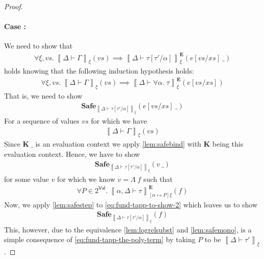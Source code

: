 \documentclass{article}
\newcommand{\VAL}{\mathsf{Val}}
\newcommand{\ectx}{\mathbf{K}}
\newcommand{\pred}{P}
\newcommand{\semtyp}[3]{\left\llbracket #2 \vdash #3 \right\rrbracket_{#1}}
\newcommand{\semErel}[1]{#1^{\textbf{E}}}
\newcommand{\semenv}{\xi}
\newcommand{\TArg}{\_}
\newcommand{\TLam}{\Lambda}
\newcommand{\Tctx}{\Gamma}
\newcommand{\CtxTps}{\Delta}
\newcommand{\expr}{e}
\newcommand{\exprB}{f}
\newcommand{\val}{v}
\newcommand{\typ}{\tau}
\newcommand{\TForall}{\forall}
\newcommand{\tvar}{\alpha}
\newcommand{\Safe}[1]{\textbf{Safe}_{#1}}
\begin{document}
\begin{proof}
\paragraph{Case :}
We need to show that
\begin{align}
  \label{eq:fund-tapp-main}
  \forall \semenv, \mathit{vs}.~\semtyp{\semenv}{\CtxTps}{\Tctx}(\mathit{vs}) \implies
  \semErel{\semtyp{\semenv}{\CtxTps}{\typ[\typ'/\tvar]}}(\expr[\mathit{vs}/\mathit{xs}]~\TArg)
\end{align}
holds knowing that the following induction hypothesis holds:
\begin{align}
  \label{eq:fund-tapp-ih}
  \forall \semenv, \mathit{vs}.~\semtyp{\semenv}{\CtxTps}{\Tctx}(\mathit{vs}) \implies \semErel{\semtyp{\semenv}{\CtxTps}{\TForall \tvar.\; \typ}}(\expr[\mathit{vs}/\mathit{xs}])
\end{align}
That is, we need to show
\begin{align}
  \label{eq:fund-tapp-to-show-1}
  \Safe{\semtyp{\semenv}{\CtxTps}{\typ[\typ'/\tvar]}}(\expr[\mathit{vs}/\mathit{xs}]~\TArg)
\end{align}
For a sequence of values $\mathit{vs}$ for which we have
\begin{align}
  \label{eq:fund-tapp-env-rel}
  \semtyp{\semenv}{\CtxTps}{\Tctx}(\mathit{vs})
\end{align}
Since $\ectx~\TArg$ is an evaluation context we apply \ref{lem:safebind} with $\ectx$ being this evaluation context.
Hence, we have to show
\begin{align}
  \label{eq:fund-tapp-to-show-2}
  \Safe{\semtyp{\semenv}{\CtxTps}{\typ[\typ'/\tvar]}}(\val~\TArg)
\end{align}
for some value $\val$ for which we know $\val = \TLam\; \exprB$ such that
\begin{align}
  \label{eq:fund-tapp-the-poly-term}
  \forall \pred \in 2^{\VAL}.~\semErel{\semtyp{[\tvar \mapsto \pred]\semenv}{\tvar, \CtxTps}{\typ}}(\exprB)
\end{align}
Now, we apply \ref{lem:safestep} to \eqref{eq:fund-tapp-to-show-2} which leaves us to show
\begin{align}
  \label{eq:fund-tapp-to-show-3}
  \Safe{\semtyp{\semenv}{\CtxTps}{\typ[\typ'/\tvar]}}(\exprB)
\end{align}
This, however, due to the equivalence \ref{lem:logrelsubst} and \ref{lem:safemono}, is a simple consequence of \eqref{eq:fund-tapp-the-poly-term} by taking $\pred$ to be $\semtyp{\semenv}{\CtxTps}{\typ'}$.


\end{proof}
\end{document}
